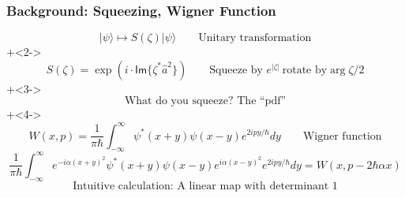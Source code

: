 \documentclass{beamer}
\newcommand*\ket[1]{|{#1}\rangle}
\begin{document}
\begin{frame}[c]
\frametitle{Background: Squeezing, Wigner Function}
  \[\ket{\psi}\mapsto S(\zeta)\ket{\psi}\qquad
    \text{Unitary transformation}
  \]
  \onslide+<2->
  \[S(\zeta)=\exp(i\cdot\mathsf{Im}\{\zeta^{*} \hat{a}^{2}\})\qquad
    \text{Squeeze by }e^{|\zeta|}\:\text{rotate by}\arg{\zeta}/2
  \]
  \onslide+<3->
  \[
    \text{What do you squeeze? The ``pdf''}
  \]
  \onslide+<4->
  \[
    W(x,p)=\frac{1}{\pi\hbar}\int_{-\infty}^{\infty}\psi^{*}(x+y)\psi(x-y)e^{2ipy/\hbar}dy\qquad
    \text{Wigner function}
  \]
  \[
    \frac{1}{\pi\hbar}\int_{-\infty}^{\infty}e^{-i\alpha(x+y)^{2}}\psi^{*}(x+y)\psi(x-y)e^{i\alpha(x-y)^{2}}e^{2ipy/\hbar}dy=W(x,p-2\hbar\alpha x)
  \]
  \[
    \text{Intuitive calculation: A linear map with determinant 1}
  \]
\end{frame}
\end{document}
